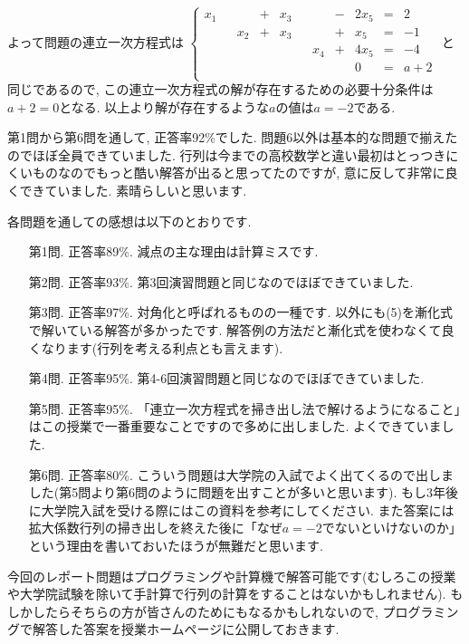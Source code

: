 \documentclass[dvipdfmx,a4paper,11pt]{article}
\theoremstyle{definition}
\begin{document}
よって問題の連立一次方程式は
$
 \left\{ 
\begin{array}{ccccccccccc}
x_1& &&  +&x_3& && -&2x_5	&=& 2\\
&&x_2& + &x_3& & & +&x_5&= &-1 \\
&&& && &  x_4&+&4x_5&= &-4\\
& & & && &   &&0&= &a+2\\
\end{array}
\right.
 $
 と同じであるので, この連立一次方程式の解が存在するための必要十分条件は$a+2=0$となる.
 以上より解が存在するような$a$の値は$a=-2$である.
\vspace{44pt} 

   
 \hspace{-11pt}{\LARGE 中間レポートについて.}

第1問から第6問を通して, 正答率92\%でした. 問題6以外は基本的な問題で揃えたのでほぼ全員できていました. 行列は今までの高校数学と違い最初はとっつきにくいものなのでもっと酷い解答が出ると思ってたのですが, 意に反して非常に良くできていました. 素晴らしいと思います.

各問題を通しての感想は以下のとおりです.
\begin{itemize}
\item [第1問.] 正答率89\%. 減点の主な理由は計算ミスです.
\item [第2問.] 正答率93\%. 第3回演習問題と同じなのでほぼできていました.
\item [第3問.] 正答率97\%. 対角化と呼ばれるものの一種です. 以外にも(5)を漸化式で解いている解答が多かったです. 解答例の方法だと漸化式を使わなくて良くなります(行列を考える利点とも言えます).
\item [第4問.] 正答率95\%. 第4-6回演習問題と同じなのでほぼできていました.
\item [第5問.] 正答率95\%. 「連立一次方程式を掃き出し法で解けるようになること」はこの授業で一番重要なことですので多めに出しました. よくできていました.
\item [第6問.] 正答率80\%. こういう問題は大学院の入試でよく出てくるので出しました(第5問より第6問のように問題を出すことが多いと思います). もし3年後に大学院入試を受ける際にはこの資料を参考にしてください. また答案には拡大係数行列の掃き出しを終えた後に「なぜ$a=-2$でないといけないのか」という理由を書いておいたほうが無難だと思います.
\end{itemize}

今回のレポート問題はプログラミングや計算機で解答可能です(むしろこの授業や大学院試験を除いて手計算で行列の計算をすることはないかもしれません). 
もしかしたらそちらの方が皆さんのためにもなるかもしれないので, プログラミングで解答した答案を授業ホームページに公開しておきます.
\end{document}
